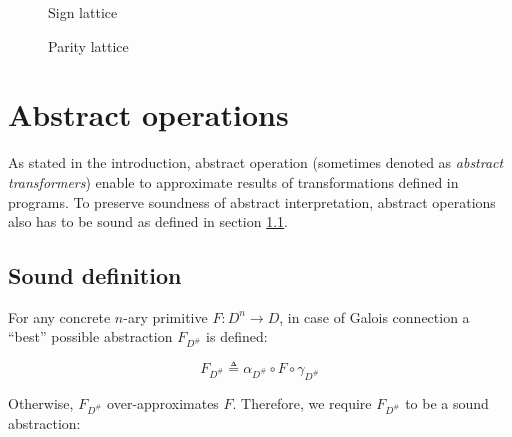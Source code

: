 \documentclass[12pt,oneside]{fithesis2}
\theoremstyle{definition}
\begin{document}
\begin{figure}[ht!]
  \centering
  \caption{Sign lattice}
\end{figure}

\begin{figure}[ht!]
  \centering
  \caption{Parity lattice}
\end{figure}

\section{Abstract operations}\label{sec:operations}

As stated in the introduction, abstract operation (sometimes denoted as \textit{abstract transformers}) enable to approximate results of transformations defined in programs. To preserve soundness of abstract interpretation, abstract operations also has to be sound as defined in section \ref{sec:operations-soundness}.

\subsection{Sound definition}\label{sec:operations-soundness}

For any concrete $n$-ary primitive $F: D^n \to D$, in case of Galois connection a ``best'' possible abstraction $F_{D^\#}$ is defined: \cite{mine-AIAA10}

\[
  F_{D^\#} \triangleq \alpha_{D^\#} \circ F \circ \gamma_{D^\#}
\]

Otherwise, $F_{D^\#}$ over-approximates $F$. Therefore, we require $F_{D^\#}$ to be a sound abstraction: \cite{CousotEtAl06-ASIAN}
\end{document}
